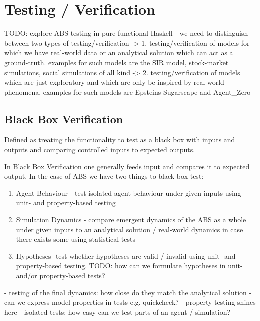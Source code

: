 \section{Testing / Verification}
TODO: explore ABS testing in pure functional Haskell
- we need to distinguish between two types of testing/verification
	-> 1. testing/verification of models for which we have real-world data or an analytical solution which can act as a ground-truth. examples for such models are the SIR model, stock-market simulations, social simulations of all kind
	-> 2. testing/verification of models which are just exploratory and which are only be inspired by real-world phenomena. examples for such models are Epsteins Sugarscape and Agent\_Zero
	
\subsection{Black Box Verification}
Defined as treating the functionality to test as a black box with inputs and outputs and comparing controlled inputs to expected outputs.

In Black Box Verification one generally feeds input and compares it to expected output. In the case of ABS we have two things to black-box test:
\begin{enumerate}
	\item Agent Behaviour - test isolated agent behaviour under given inputs using unit- and property-based testing
	\item Simulation Dynamics - compare emergent dynamics of the ABS as a whole under given inputs to an analytical solution / real-world dynamics in case there exists some using statistical tests
	\item Hypotheses- test whether hypotheses are valid / invalid using unit- and property-based testing. TODO: how can we formulate hypotheses in unit- and/or property-based tests?
\end{enumerate}

- testing of the final dynamics: how close do they match the analytical solution
- can we express model properties in tests e.g. quickcheck?
- property-testing shines here
- isolated tests: how easy can we test parts of an agent / simulation?

